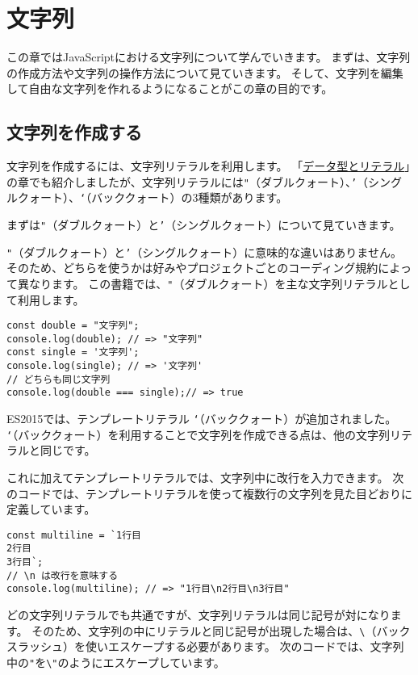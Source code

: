 \hypertarget{string}{%
\chapter{文字列}\label{string}}

この章ではJavaScriptにおける文字列について学んでいきます。
まずは、文字列の作成方法や文字列の操作方法について見ていきます。
そして、文字列を編集して自由な文字列を作れるようになることがこの章の目的です。

\hypertarget{create}{%
\section{文字列を作成する}\label{create}}

文字列を作成するには、文字列リテラルを利用します。
「\href{../data-type/README.md}{データ型とリテラル}」の章でも紹介しましたが、文字列リテラルには\texttt{"}（ダブルクォート）、\texttt{'}（シングルクォート）、\texttt{`}（バッククォート）の3種類があります。

まずは\texttt{"}（ダブルクォート）と\texttt{'}（シングルクォート）について見ていきます。

\texttt{"}（ダブルクォート）と\texttt{'}（シングルクォート）に意味的な違いはありません。
そのため、どちらを使うかは好みやプロジェクトごとのコーディング規約によって異なります。
この書籍では、\texttt{"}（ダブルクォート）を主な文字列リテラルとして利用します。

\begin{lstlisting}
const double = "文字列";
console.log(double); // => "文字列"
const single = '文字列';
console.log(single); // => '文字列'
// どちらも同じ文字列
console.log(double === single);// => true
\end{lstlisting}

ES2015では、テンプレートリテラル
\texttt{`}（バッククォート）が追加されました。
\texttt{`}（バッククォート）を利用することで文字列を作成できる点は、他の文字列リテラルと同じです。

これに加えてテンプレートリテラルでは、文字列中に改行を入力できます。
次のコードでは、テンプレートリテラルを使って複数行の文字列を見た目どおりに定義しています。

\begin{lstlisting}
const multiline = `1行目
2行目
3行目`;
// \n は改行を意味する
console.log(multiline); // => "1行目\n2行目\n3行目"
\end{lstlisting}

どの文字列リテラルでも共通ですが、文字列リテラルは同じ記号が対になります。
そのため、文字列の中にリテラルと同じ記号が出現した場合は、\texttt{\textbackslash}（バックスラッシュ）を使いエスケープする必要があります。
次のコードでは、文字列中の\texttt{"}を\texttt{\textbackslash"}のようにエスケープしています。

